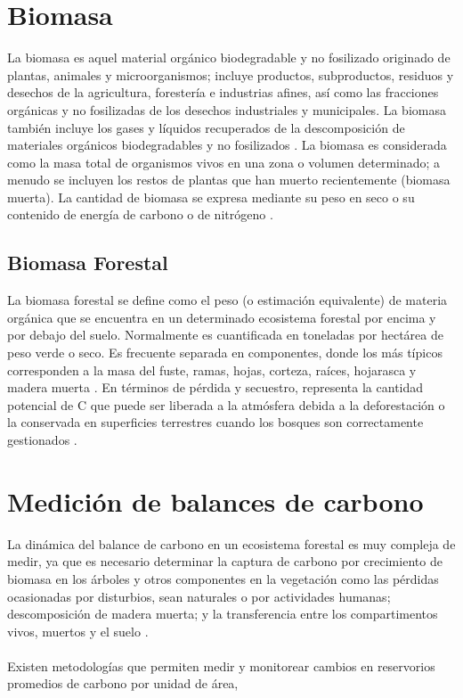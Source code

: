\section{Biomasa}
La biomasa es aquel material org\'anico biodegradable y no fosilizado originado de plantas, animales y microorganismos; incluye productos, subproductos, residuos y desechos de la agricultura, forester\'ia e industrias afines, as\'i como las fracciones org\'anicas y no fosilizadas de los desechos industriales y municipales. La biomasa tambi\'en incluye los gases y l\'iquidos recuperados de la descomposici\'on de materiales org\'anicos biodegradables y no fosilizados \cite{salinas2008guia}.
La biomasa es considerada como la masa total de organismos vivos en una zona o volumen determinado; a menudo se incluyen los restos de plantas que han muerto recientemente (biomasa muerta). La cantidad de biomasa se expresa mediante su peso en seco o su contenido de energ\'ia de carbono o de nitr\'ogeno \cite{garciduenas1987produccion}.
\subsection{Biomasa Forestal}
La biomasa forestal se define como el peso (o estimaci\'on equivalente) de materia org\'anica que
se encuentra en un determinado ecosistema forestal por encima y por debajo del suelo. Normalmente es
cuantificada en toneladas por hect\'area de peso verde o seco. Es frecuente separada en
componentes, donde los m\'as t\'ipicos corresponden a la masa del fuste, ramas, hojas, corteza,
ra\'ices, hojarasca y madera muerta \cite{schlegel2000manual}. 
En t\'erminos de p\'erdida y secuestro, representa la cantidad potencial de C que puede ser liberada a la atm\'osfera debida a la deforestaci\'on o la conservada en superficies terrestres cuando los bosques son correctamente gestionados \cite{lu2005exploring}.

\section{Medici\'on de balances de carbono}
La din\'amica del balance de carbono en un ecosistema forestal es muy compleja de medir, ya que es necesario determinar la captura de carbono por crecimiento de biomasa en los \'arboles y otros componentes en la vegetaci\'on como las p\'erdidas ocasionadas por disturbios, sean naturales o por actividades humanas; descomposici\'on de madera muerta; y la transferencia entre los compartimentos vivos, muertos y el suelo \cite{angelsen2008moving}.\\~\\
Existen metodolog\'ias que permiten medir y monitorear cambios en reservorios promedios de carbono por unidad de \'area, 

